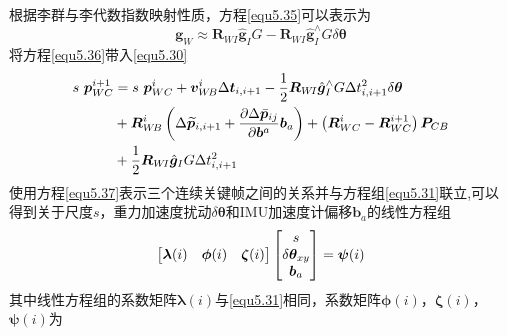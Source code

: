 根据李群与李代数指数映射性质，方程\eqref{equ5.35}可以表示为
\begin{equation}
\label{equ5.36}
\boldsymbol{g}_W \approx \boldsymbol{R}_{W\!I} \hat{\boldsymbol{g}}_I G - \boldsymbol{R}_{W\!I} \hat{\boldsymbol{g}}_I^{\wedge}G\delta \boldsymbol{\theta} 
\end{equation}
将方程\eqref{equ5.36}带入\eqref{equ5.30}
\begin{equation}
\label{equ5.37}
\begin{aligned}
s \ \boldsymbol{p}_{WC}^{i+1} &= s \ \boldsymbol{p}_{WC}^i +  \boldsymbol{v}_{W\!B}^i \Delta \boldsymbol{t}_{i,i+1} 
- { 1 \over 2} \boldsymbol{R}_{W\!I} \hat{\boldsymbol{g}}_I^{\wedge}G \Delta t_{i,i+1}^2  \delta \boldsymbol{\theta} 
\\
& + \boldsymbol{R}_{W\!B}^i \left( \Delta \widetilde{\boldsymbol{p}}_{i,i+1} + {\partial \Delta \bar{\boldsymbol{p}}_{ij} \over \partial \boldsymbol{b}^a } \boldsymbol{b}_a  \right) +\left( \boldsymbol{R}_{WC}^i - \boldsymbol{R}_{WC}^{i+1} \right) \boldsymbol{P}_{CB} 
\\
& + {1 \over 2} \boldsymbol{R}_{W\!I} \hat{\boldsymbol{g}}_I G \Delta t_{i,i+1}^2
\end{aligned}
\end{equation}
使用方程\eqref{equ5.37}表示三个连续关键帧之间的关系并与方程组\eqref{equ5.31}联立,可以得到关于尺度$s$，重力加速度扰动$\delta \boldsymbol{\theta}$和IMU加速度计偏移$\boldsymbol{b}_a$的线性方程组
\begin{equation}
\label{equ5.38}
\begin{bmatrix}
\boldsymbol{\lambda} (i) & \boldsymbol{\phi} (i) & \boldsymbol{\zeta}  (i) \cr
\end{bmatrix}
\begin{bmatrix}
s \cr \delta \boldsymbol{\theta}_{xy} \cr \boldsymbol{b}_a \cr
\end{bmatrix}
= \boldsymbol{\psi} (i)
\end{equation}
其中线性方程组的系数矩阵$\boldsymbol{\lambda} (i)$与\eqref{equ5.31}相同，系数矩阵$\boldsymbol{\phi}(i)$，$\boldsymbol{\zeta}(i)$，$\boldsymbol{\psi}(i)$为

